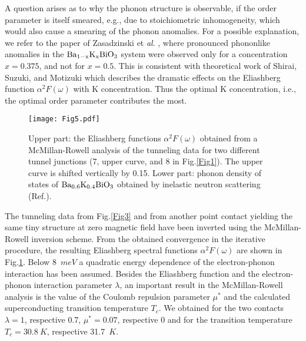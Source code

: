 \documentclass[twocolumn,amsmath,floats,showpacs,nofootinbib]{revtex4}
\begin{document}
A question arises as to why the phonon structure is observable, if the order parameter is itself smeared, e.g., due to stoichiometric inhomogeneity, which would also cause a smearing of the phonon anomalies. For a possible explanation, we refer to the paper of Zasadzinski et \emph{al}. \cite{6}, where pronounced phononlike anomalies in the $\rm Ba_{1-x}K_xBiO_3$ system were observed only for a concentration $x =0.375$, and not for $x =0.5$. This is consistent with theoretical work of Shirai, Suzuki, and Motizuki \cite{12} which describes the dramatic effects on the Eliashberg function $\alpha^2F(\omega)$ with K concentration. Thus the optimal
K concentration, i.e., the optimal order parameter contributes the most.

\begin{figure}[]
\texttt{[image: Fig5.pdf]}
\caption[]{Upper part: the Eliashberg functions $\alpha^2F(\omega)$ obtained from a McMillan-Rowell analysis of the tunneling data for two different tunnel junctions (7, upper curve, and 8 in Fig.\ref{Fig1}). The upper curve is shifted vertically by 0.15. Lower part: phonon density of states of $\rm Ba_{0.6}K_{0.4}BiO_3$ obtained by inelastic neutron scattering (Ref.\cite{13}).}
\label{Fig5}
\end{figure}

The tunneling data from Fig.\ref{Fig3} and from another point contact yielding the same tiny structure at zero magnetic field have been inverted using the McMillan-Rowell inversion scheme. From the obtained convergence in the iterative procedure, the resulting Eliashberg spectral functions $\alpha^2F(\omega)$ are shown in Fig.\ref{Fig5}. Below 8~$meV$ a quadratic energy dependence of the electron-phonon interaction has been assumed. Besides the Eliashberg function and the electron-phonon interaction parameter $\lambda$, an important result in the McMillan-Rowell analysis is the value of the Coulomb repulsion parameter $\mu^*$ and the calculated superconducting transition temperature $T_c$. We obtained for the two contacts $\lambda=1$, respective 0.7, $\mu^* =0.07$, respective 0 and for the transition temperature $T_c= 30.8\ K$, respective 31.7~$K$.
\end{document}
